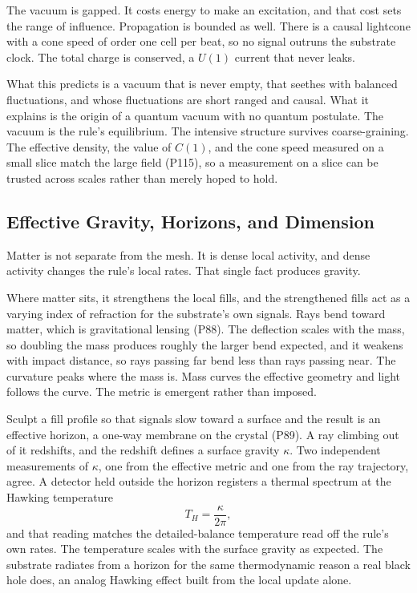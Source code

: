 The vacuum is gapped. It costs energy to make an excitation, and that cost sets the range of influence. Propagation is bounded as well. There is a causal lightcone with a cone speed of order one cell per beat, so no signal outruns the substrate clock. The total charge is conserved, a $U(1)$ current that never leaks.

What this predicts is a vacuum that is never empty, that seethes with balanced fluctuations, and whose fluctuations are short ranged and causal. What it explains is the origin of a quantum vacuum with no quantum postulate. The vacuum is the rule's equilibrium. The intensive structure survives coarse-graining. The effective density, the value of $C(1)$, and the cone speed measured on a small slice match the large field (P115), so a measurement on a slice can be trusted across scales rather than merely hoped to hold.

\subsection{Effective Gravity, Horizons, and Dimension}

Matter is not separate from the mesh. It is dense local activity, and dense activity changes the rule's local rates. That single fact produces gravity.

Where matter sits, it strengthens the local fills, and the strengthened fills act as a varying index of refraction for the substrate's own signals. Rays bend toward matter, which is gravitational lensing (P88). The deflection scales with the mass, so doubling the mass produces roughly the larger bend expected, and it weakens with impact distance, so rays passing far bend less than rays passing near. The curvature peaks where the mass is. Mass curves the effective geometry and light follows the curve. The metric is emergent rather than imposed.

Sculpt a fill profile so that signals slow toward a surface and the result is an effective horizon, a one-way membrane on the crystal (P89). A ray climbing out of it redshifts, and the redshift defines a surface gravity $\kappa$. Two independent measurements of $\kappa$, one from the effective metric and one from the ray trajectory, agree. A detector held outside the horizon registers a thermal spectrum at the Hawking temperature
\begin{equation}
T_H = \frac{\kappa}{2\pi},
\end{equation}
and that reading matches the detailed-balance temperature read off the rule's own rates. The temperature scales with the surface gravity as expected. The substrate radiates from a horizon for the same thermodynamic reason a real black hole does, an analog Hawking effect built from the local update alone.

